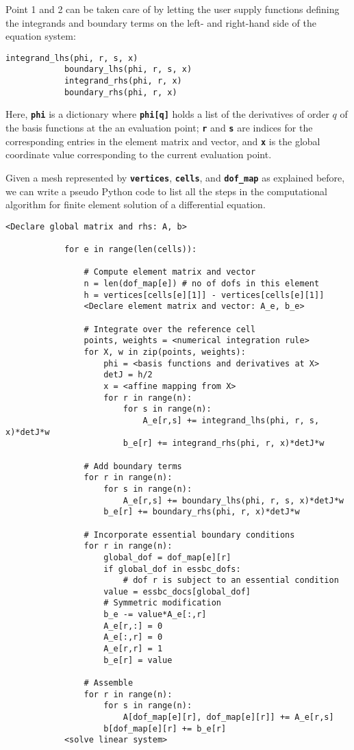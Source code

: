\documentclass[../main.tex]{subfiles}
\begin{document}
		 Point 1 and 2 can be taken care of by letting the user supply functions defining the integrands and boundary terms on the left- and right-hand side of the equation system:
		 
		\begin{lstlisting}[numbers=none]
			integrand_lhs(phi, r, s, x)
			boundary_lhs(phi, r, s, x)
			integrand_rhs(phi, r, x)
			boundary_rhs(phi, r, x)
		\end{lstlisting}
	 
	 	\noindent Here, \textbf{\texttt{phi}} is a dictionary where \textbf{\texttt{phi[q]}} holds a list of the derivatives of order $q$ of the basis functions at the an evaluation point; \textbf{\texttt{r}} and \textbf{\texttt{s}} are indices for the corresponding entries in the element matrix and vector, and \textbf{\texttt{x}} is the global coordinate value corresponding to the current evaluation point.
	 	
	 	Given a mesh represented by \textbf{\texttt{vertices}}, \textbf{\texttt{cells}}, and \textbf{\texttt{dof\_map}} as explained before, we can write a pseudo Python code to list all the steps in the computational algorithm for finite element solution of a differential equation.
	 	
	 	\begin{lstlisting}[numbers=none]
			<Declare global matrix and rhs: A, b>
			
			for e in range(len(cells)):
			
				# Compute element matrix and vector
				n = len(dof_map[e]) # no of dofs in this element
				h = vertices[cells[e][1]] - vertices[cells[e][1]]
				<Declare element matrix and vector: A_e, b_e>
			
				# Integrate over the reference cell
				points, weights = <numerical integration rule>
				for X, w in zip(points, weights):
					phi = <basis functions and derivatives at X>
					detJ = h/2
					x = <affine mapping from X>
					for r in range(n):
						for s in range(n):
							A_e[r,s] += integrand_lhs(phi, r, s, x)*detJ*w
						b_e[r] += integrand_rhs(phi, r, x)*detJ*w
			
				# Add boundary terms
				for r in range(n):
					for s in range(n):
						A_e[r,s] += boundary_lhs(phi, r, s, x)*detJ*w
					b_e[r] += boundary_rhs(phi, r, x)*detJ*w
			
				# Incorporate essential boundary conditions
				for r in range(n):
					global_dof = dof_map[e][r]
					if global_dof in essbc_dofs:
						# dof r is subject to an essential condition
					value = essbc_docs[global_dof]
					# Symmetric modification
					b_e -= value*A_e[:,r]
					A_e[r,:] = 0
					A_e[:,r] = 0
					A_e[r,r] = 1
					b_e[r] = value
			
				# Assemble
				for r in range(n):
					for s in range(n):
						A[dof_map[e][r], dof_map[e][r]] += A_e[r,s]
					b[dof_map[e][r] += b_e[r]
			<solve linear system>
		\end{lstlisting}
\clearpage
\end{document}
